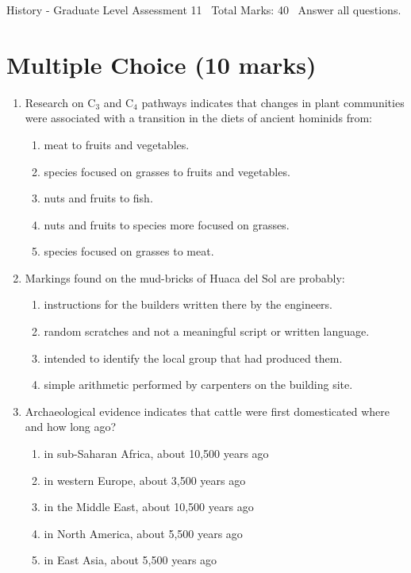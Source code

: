 \documentclass[12pt]{article}
\begin{document}
\begin{center}
History - Graduate Level Assessment 11 \
Total Marks: 40 \
Answer all questions.
\end{center}

\section*{Multiple Choice (10 marks)}
\begin{enumerate}[label=\arabic*.]
\item Research on C$_{3}$ and C$_{4}$ pathways indicates that changes in plant communities were associated with a transition in the diets of ancient hominids from:
\begin{enumerate}[label=(\alph*)]
    \item meat to fruits and vegetables.
    \item species focused on grasses to fruits and vegetables.
    \item nuts and fruits to fish.
    \item nuts and fruits to species more focused on grasses.
    \item species focused on grasses to meat.
\end{enumerate}
\item Markings found on the mud-bricks of Huaca del Sol are probably:
\begin{enumerate}[label=(\alph*)]
    \item instructions for the builders written there by the engineers.
    \item random scratches and not a meaningful script or written language.
    \item intended to identify the local group that had produced them.
    \item simple arithmetic performed by carpenters on the building site.
\end{enumerate}
\item Archaeological evidence indicates that cattle were first domesticated where and how long ago?
\begin{enumerate}[label=(\alph*)]
    \item in sub-Saharan Africa, about 10,500 years ago
    \item in western Europe, about 3,500 years ago
    \item in the Middle East, about 10,500 years ago
    \item in North America, about 5,500 years ago
    \item in East Asia, about 5,500 years ago

\end{enumerate}
\end{enumerate}
\end{document}

